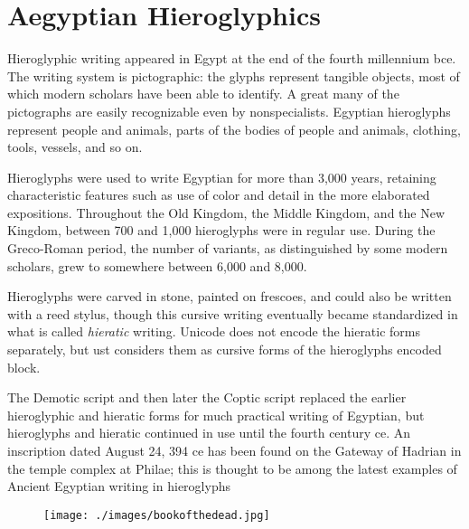 \newfontfamily{}


\chapter{Aegyptian Hieroglyphics}
\label{ch:hieroglyphics}


\newfontfamily{}

Hieroglyphic writing appeared in Egypt at the end of the fourth millennium bce. The writing
system is pictographic: the glyphs represent tangible objects, most of which modern
scholars have been able to identify. A great many of the pictographs are easily recognizable
even by nonspecialists. Egyptian hieroglyphs represent people and animals, parts of the
bodies of people and animals, clothing, tools, vessels, and so on.

Hieroglyphs were used to write Egyptian for more than 3,000 years, retaining characteristic
features such as use of color and detail in the more elaborated expositions. Throughout the
Old Kingdom, the Middle Kingdom, and the New Kingdom, between 700 and 1,000 hieroglyphs
were in regular use. During the Greco-Roman period, the number of variants, as
distinguished by some modern scholars, grew to somewhere between 6,000 and 8,000.

Hieroglyphs were carved in stone, painted on frescoes, and could also be written with a reed
stylus, though this cursive writing eventually became standardized in what is called \emph{hieratic}
writing. Unicode does not encode the hieratic forms separately, but ust considers them as cursive forms of the hieroglyphs encoded block.

The Demotic script and then later the Coptic script replaced the earlier hieroglyphic and
hieratic forms for much practical writing of Egyptian, but hieroglyphs and hieratic continued
in use until the fourth century ce. An inscription dated August 24, 394 ce has been
found on the Gateway of Hadrian in the temple complex at Philae; this is thought to be
among the latest examples of Ancient Egyptian writing in hieroglyphs

\begin{figure}[htb]
\texttt{[image: ./images/bookofthedead.jpg]}
\end{figure}

